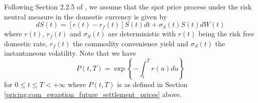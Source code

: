 Following Section 2.2.5 of \cite{Clark_2014}, we assume that the spot price process under the risk neutral measure in the domestic currency is given by
\begin{equation}
\label{eq:comm_spot_price_process}
dS(t) = \left[ r(t) - r_f(t) \right] S(t) dt + \sigma_{S}(t) S(t) dW(t)
\end{equation}
where $r(t)$, $r_f(t)$ and $\sigma_{S}(t)$ are deterministic with $r(t)$ being the risk free domestic rate, $r_f(t)$ the commodity convenience yield and $\sigma_{S}(t)$ the instantaneous volatility. Note that we have
\begin{equation}
P(t, T) = \exp \left\{ -\int_t^T r(u) du \right\}
\end{equation}
for $0 \leq t \leq T < +\infty$ where $P(t, T)$ is as defined in Section \ref{pricing:com_swaption_future_settlement_prices} above.

